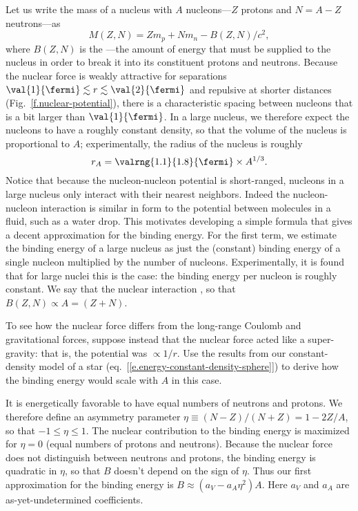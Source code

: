  Let us write the mass of a nucleus with $A$ nucleons---$Z$ protons and $N=A-Z$ neutrons---as
\[
	M(Z,N) = Zm_{p} + Nm_{n} - B(Z,N)/c^{2},
\]
where $B(Z,N)$ is the ---the amount of energy that must be supplied to the nucleus in order to break it into its constituent protons and neutrons.
Because the nuclear force is weakly attractive for separations $\val{1}{\fermi}\lesssim r\lesssim\val{2}{\fermi}$ and repulsive at shorter distances (Fig.~\ref{f.nuclear-potential}), there is a characteristic spacing between nucleons that is a bit larger than $\val{1}{\fermi}$. In a large nucleus, we therefore expect the nucleons to have a roughly constant density, so that the volume of the nucleus is proportional to $A$; experimentally, the radius of the nucleus is roughly
\[
	r_{A} = \valrng{1.1}{1.8}{\fermi}\times A^{1/3}.
\]
Notice that because the nucleon-nucleon potential is short-ranged, nucleons in a large nucleus only interact with their nearest neighbors. Indeed the nucleon-nucleon interaction is similar in form to the potential between molecules in a fluid, such as a water drop. This motivates developing a simple formula that gives a decent approximation for the binding energy. For the first term, we estimate the binding energy of a large nucleus as just the (constant) binding energy of a single nucleon multiplied by the number of nucleons. Experimentally, it is found that for large nuclei this is the case: the binding energy per nucleon is roughly constant. We say that the nuclear interaction , so that $B(Z,N) \propto A = (Z+N)$.

\begin{exercisebox}
To see how the nuclear force differs from the long-range Coulomb and gravitational forces, suppose instead that the nuclear force acted like a super-gravity: that is, the potential was $\propto 1/r$. Use the results from our constant-density model of a star (eq.~[\ref{e.energy-constant-density-sphere}]) to derive how the binding energy would scale with $A$ in this case.
\end{exercisebox}

It is energetically favorable to have equal numbers of neutrons and protons. We therefore define an asymmetry parameter $\eta \equiv (N-Z)/(N+Z) = 1-2Z/A$, so that $-1\le\eta\le1$. The nuclear contribution to the binding energy is maximized for $\eta = 0$ (equal numbers of protons and neutrons). Because the nuclear force does not distinguish between neutrons and protons, the binding energy is quadratic in $\eta$, so that $B$ doesn't depend on the sign of $\eta$. Thus our first approximation for the binding energy is $B \approx (a_{V} - a_{A}\eta^{2}) A$. Here $a_{V}$ and $a_{A}$ are as-yet-undetermined coefficients.

